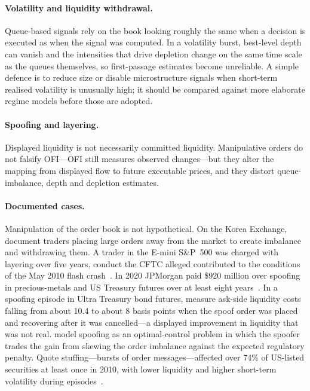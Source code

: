 \paragraph{Volatility and liquidity withdrawal.} Queue-based signals rely on the book looking roughly
the same when a decision is executed as when the signal was computed. In a volatility burst, best-level
depth can vanish and the intensities that drive depletion change on the same time scale as the queues
themselves, so first-passage estimates become unreliable. A simple defence is to reduce size or disable
microstructure signals when short-term realised volatility is unusually high; it should be compared
against more elaborate regime models before those are adopted.

\paragraph{Spoofing and layering.} Displayed liquidity is not necessarily committed liquidity.
Manipulative orders do not falsify OFI---OFI still measures observed changes---but they alter the
mapping from displayed flow to future executable prices, and they distort queue-imbalance, depth
and depletion estimates.

\paragraph{Documented cases.} Manipulation of the order book is not hypothetical. On the Korea Exchange,
\citet{lee2013spoof} document traders placing large orders away from the market to create imbalance and
withdrawing them. A trader in the E-mini S\&P~500 was charged with layering over five years, conduct the
CFTC alleged contributed to the conditions of the May 2010 flash crash~\citep{cftc2015sarao}. In 2020
JPMorgan paid \$920 million over spoofing in precious-metals and US Treasury futures over at least eight
years~\citep{cftc2020jpm}. In a spoofing episode in Ultra Treasury bond futures, \citet{debie2023} measure ask-side
liquidity costs falling from about 10.4 to about 8 basis points when the spoof order was placed and
recovering after it was cancelled---a displayed improvement in liquidity that was not real.
\citet{cartea2020spoof} model spoofing as an optimal-control problem in which the spoofer trades the gain
from skewing the order imbalance against the expected regulatory penalty. Quote stuffing---bursts of
order messages---affected over 74\% of US-listed securities at least once in 2010, with lower liquidity
and higher short-term volatility during episodes~\citep{egginton2016}.

